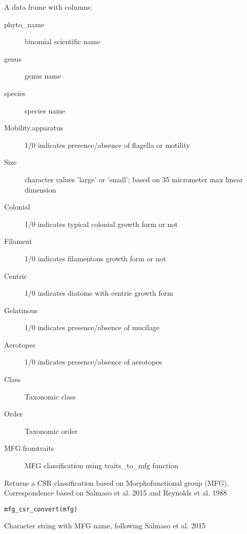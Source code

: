 \documentclass[a4paper]{book}
\begin{document}
\begin{Format}
A data frame with columns:
\begin{description}

\item[phyto\_name] binomial scientific name
\item[genus] genus name
\item[species] species name
\item[Mobility.apparatus] 1/0 indicates presence/absence of flagella or motility
\item[Size] character values 'large' or 'small'; based on 35 micrometer max linear dimension
\item[Colonial] 1/0 indicates typical colonial growth form or not
\item[Filament] 1/0 indicates filamentous growth form or not
\item[Centric] 1/0 indicates diatoms with centric growth form
\item[Gelatinous] 1/0 indicates presence/absence of mucilage
\item[Aerotopes] 1/0 indicates presence/absence of aerotopes
\item[Class] Taxonomic class
\item[Order] Taxonomic order
\item[MFG.fromtraits] MFG classification using traits\_to\_mfg function

\end{description}

\end{Format}
%
\begin{Description}\relax
Returns a CSR classification based on Morphofunctional group (MFG).
Correspondence based on Salmaso et al. 2015 and Reynolds et al. 1988
\end{Description}
%
\begin{Usage}
\begin{verbatim}
mfg_csr_convert(mfg)
\end{verbatim}
\end{Usage}
%
\begin{Arguments}
\begin{ldescription}
\item[\code{mfg}] Character string with MFG name, following Salmaso et al. 2015
\end{ldescription}
\end{Arguments}
\end{document}
